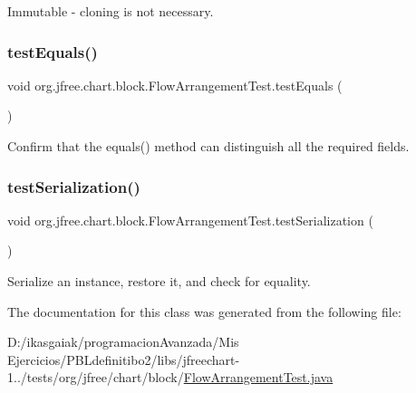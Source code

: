 Immutable -\/ cloning is not necessary. \mbox{\label{classorg_1_1jfree_1_1chart_1_1block_1_1_flow_arrangement_test_a8524cbcfe056c1807946f2d5823f6d3f}} 
\subsubsection{\texorpdfstring{test\+Equals()}{testEquals()}}
{\footnotesize\ttfamily void org.\+jfree.\+chart.\+block.\+Flow\+Arrangement\+Test.\+test\+Equals (\begin{DoxyParamCaption}{ }\end{DoxyParamCaption})}

Confirm that the equals() method can distinguish all the required fields. \mbox{\label{classorg_1_1jfree_1_1chart_1_1block_1_1_flow_arrangement_test_a63dc3eab2d51b8a8f9148aef61e384ee}} 
\subsubsection{\texorpdfstring{test\+Serialization()}{testSerialization()}}
{\footnotesize\ttfamily void org.\+jfree.\+chart.\+block.\+Flow\+Arrangement\+Test.\+test\+Serialization (\begin{DoxyParamCaption}{ }\end{DoxyParamCaption})}

Serialize an instance, restore it, and check for equality. 

The documentation for this class was generated from the following file\+:\begin{DoxyCompactItemize}
\item 
D\+:/ikasgaiak/programacion\+Avanzada/\+Mis Ejercicios/\+P\+B\+Ldefinitibo2/libs/jfreechart-\/1../tests/org/jfree/chart/block/\mbox{\hyperlink{_flow_arrangement_test_8java}{Flow\+Arrangement\+Test.\+java}}\end{DoxyCompactItemize}
